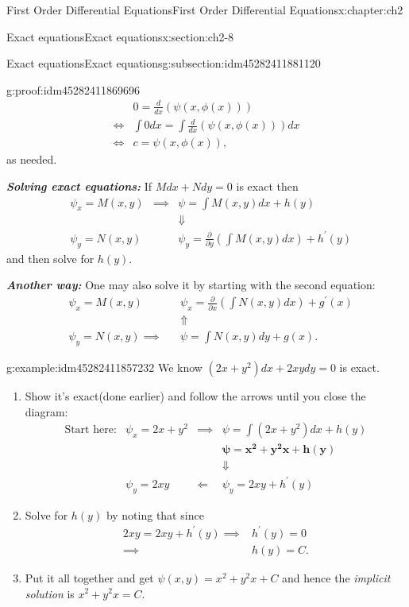 \documentclass[oneside,10pt,]{book}
\newcommand{\alert}[1]{\textbf{\textit{#1}}}
\numberwithin{equation}{section}
\numberwithin{equation}{section}
\newcommand{\amp}{&}
\begin{document}
\begin{chapterptx}{First Order Differential Equations}{}{First Order Differential Equations}{}{}{x:chapter:ch2}
\begin{sectionptx}{Exact equations}{}{Exact equations}{}{}{x:section:ch2-8}
\begin{subsectionptx}{Exact equations}{}{Exact equations}{}{}{g:subsection:idm45282411881120}
\begin{proofptx}{}{g:proof:idm45282411869696}
\begin{align*}
\amp 0 =\frac{d}{dx}\left(\psi\left(x,\phi(x)\right)\right) \\
\iff\amp \int0dx=\int\frac{d}{dx}\left(\psi\left(x,\phi(x)\right)\right)dx\\
\iff \amp c=\psi\left(x,\phi(x)\right),
\end{align*}
as needed.\end{proofptx}
\alert{Solving exact equations:} If \(Mdx+Ndy=0\) is exact then%
\begin{align*}
\amp \psi_{x}=M(x,y) \amp \implies \amp \psi=\int M(x,y)dx+h(y)\\
\amp \amp \amp \Downarrow\\
\amp \psi_{y}=N(x,y) \amp \amp \psi_{y}=\frac{\partial}{\partial y}\left(\int M(x,y)dx\right)+h^{\prime}(y)
\end{align*}
and then solve for \(h(y)\).%
\par
\alert{Another way:} One may also solve it by starting with the second equation:%
\begin{align*}
\amp \psi_{x}=M(x,y) \amp \amp \psi_{x}=\frac{\partial}{\partial x}\left(\int N(x,y)dx\right)+g^{\prime}(x)\\
\amp \amp \amp \Uparrow\\
\amp\psi_{y}=N(x,y)\implies \amp \amp\psi=\int N(x,y)dy+g(x).
\end{align*}
%
\begin{example}{}{g:example:idm45282411857232}%
We know \(\left(2x+y^{2}\right)dx+2xydy=0\) is exact.%
\begin{enumerate}
\item{}Show it's exact(done earlier) and follow the arrows until you close the diagram:%
\begin{align*}
\text{Start here:} \amp \psi_{x}=2x+y^{2} \amp \implies \amp \psi=\int\left(2x+y^{2}\right)dx+h(y)\\
\amp  \amp  \amp \boldsymbol{\psi=x^{2}+y^{2}x+h(y)}\\
\amp  \amp  \amp \Downarrow\\
\amp \psi_{y}=2xy \amp \Longleftarrow \amp \psi_{y}=2xy+h^{\prime}(y)
\end{align*}
%
\item{}Solve for \(h(y)\) by noting that since%
\begin{align*}
2xy=2xy+h^{\prime}(y)\implies \amp h^{\prime}(y)=0\\
\implies \amp h(y)=C.
\end{align*}
%
\item{}Put it all together and get \(\psi(x,y)=x^{2}+y^{2}x+C\) and hence the \emph{implicit solution} is \(x^{2}+y^{2}x=C.\)%

\end{enumerate}
\end{example}
\end{subsectionptx}
\end{sectionptx}
\end{chapterptx}
\end{document}
